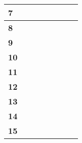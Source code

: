 \documentclass[12pt]{article}
\begin{document}
\begin{table}[h]
{\begin{tabular}{|
>{}C{1cm} |C{2cm}|C{2cm}|C{2cm}|C{2cm}|C{2cm}|C{2cm}|C{2cm}|}
\textbf{7}  &                                    &                                    &                                    &                                    &                                    &                                    &                                    \\ \hline
\textbf{8}  &                                    &                                    &                                    &                                    &                                    &                                    &                                    \\ \hline
\textbf{9}  &                                    &                                    &                                    &                                    &                                    &                                    &                                    \\ \hline
\textbf{10} &                                    &                                    &                                    &                                    &                                    &                                    &                                    \\ \hline
\textbf{11} &                                    &                                    &                                    &                                    &                                    &                                    &                                    \\ \hline
\textbf{12} &                                    &                                    &                                    &                                    &                                    &                                    &                                    \\ \hline
\textbf{13} &                                    &                                    &                                    &                                    &                                    &                                    &                                    \\ \hline
\textbf{14} &                                    &                                    &                                    &                                    &                                    &                                    &                                    \\ \hline
\textbf{15} &                                    &                                    &                                    &                                    &                                    &                                    &                                    \\ \hline

\end{tabular}}
\end{table}
\end{document}
